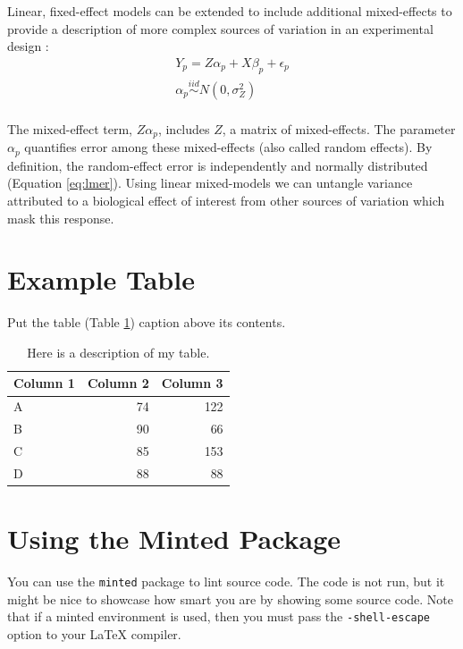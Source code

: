 \documentclass[PhD]{dukethesis}
\begin{document}
Linear, fixed-effect models can be extended to include additional mixed-effects
to provide a description of more complex sources of variation in an experimental
design \cite{Bates2015}:
\begin{equation}
	\begin{gathered}
		\label{eq:lmer}
		Y_{p} =  Z\alpha_{p} + X\beta_{p} + \epsilon_{p} \\
		\alpha_{p} \stackrel{iid}{\sim} N(0,\sigma_{Z}^2) \\
	\end{gathered}
\end{equation}

The mixed-effect term, $Z\alpha_{p}$, includes $Z$, a matrix of mixed-effects.
The parameter $\alpha_{p}$ quantifies error among these mixed-effects (also
called random effects).  By definition, the random-effect error is independently
and normally distributed (Equation \ref{eq:lmer}). Using linear mixed-models we
can untangle variance attributed to a biological effect of interest from other
sources of variation which mask this response.


\section{Example Table}

Put the table (Table \ref{table:example}) caption above its contents.

\begin{table}[ht]
	\caption[This is my table's caption.]{
		Here is a description of my table.}
	\begin{tabular}{lrr}
		\hline
		\textbf{Column 1} & \textbf{Column 2} & \textbf{Column 3} \\
		\hline
		A & 74 & 122\\
		B & 90 & 66\\
		C & 85 & 153\\
		D & 88 & 88\\
		\hline
	\end{tabular}
	\label{table:example}
\end{table}


\section{Using the Minted Package}

You can use the \texttt{minted} package to lint source code. The code is not
run, but it might be nice to showcase how smart you are by showing some source
code. Note that if a minted environment is used, then you must pass the
\texttt{-shell-escape} option to your LaTeX compiler.
\end{document}
